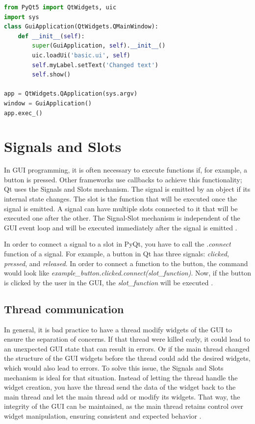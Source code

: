 \begin{lstlisting}[language=python, caption={Simple Qt GUI application}, label={lst:pyqt_gui}]
from PyQt5 import QtWidgets, uic
import sys
class GuiApplication(QtWidgets.QMainWindow):
    def __init__(self):
        super(GuiApplication, self).__init__()
        uic.loadUi('basic.ui', self)
        self.myLabel.setText('Changed text')
        self.show()

app = QtWidgets.QApplication(sys.argv)
window = GuiApplication()
app.exec_()
\end{lstlisting}

\section{Signals and Slots}
\label{sub:signals}

In GUI programming, it is often necessary to execute functions if, for example, a button is pressed. Other frameworks use callbacks to achieve this functionality; Qt uses the Signals and Slots mechanism. The signal is emitted by an object if its internal state changes. The slot is the function that will be executed once the signal is emitted. A signal can have multiple slots connected to it that will be executed one after the other. The Signal-Slot mechanism is independent of the GUI event loop and will be executed immediately after the signal is emitted \cite{qt}.

In order to connect a signal to a slot in PyQt, you have to call the \textit{.connect} function of a signal. For example, a button in Qt has three signals: \textit{clicked}, \textit{pressed}, and \textit{released}. In order to connect a function to the button, the command would look like \textit{example\_button.clicked.connect(slot\_function)}. Now, if the button is clicked by the user in the GUI, the \textit{slot\_function} will be executed \cite{pyqt}.

\subsection{Thread communication}
\label{sub:thread_communication}

In general, it is bad practice to have a thread modify widgets of the GUI to ensure the separation of concerns. If that thread were killed early, it could lead to an unexpected GUI state that can result in errors. Or if the main thread changed the structure of the GUI widgets before the thread could add the desired widgets, which would also lead to errors. To solve this issue, the Signals and Slots mechanism is ideal for that situation. Instead of letting the thread handle the widget creation, you have the thread send the data of the widget back to the main thread and let the main thread add or modify its widgets. That way, the integrity of the GUI can be maintained, as the main thread retains control over widget manipulation, ensuring consistent and expected behavior \cite{qt}.

